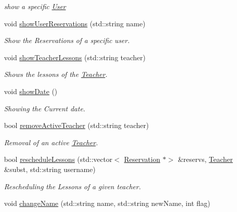 \begin{DoxyCompactItemize}
\begin{DoxyCompactList}\small\item\em show a specific \mbox{\hyperlink{class_user}{User}} \end{DoxyCompactList}\item 
void \mbox{\hyperlink{class_company_a428b70dbf9acd5edb34ee131ff1f8613}{show\+User\+Reservations}} (std\+::string name)
\begin{DoxyCompactList}\small\item\em Show the Reservations of a specific user. \end{DoxyCompactList}\item 
void \mbox{\hyperlink{class_company_aef95f2feab286505091c38db23cd1c90}{show\+Teacher\+Lessons}} (std\+::string teacher)
\begin{DoxyCompactList}\small\item\em Shows the lessons of the \mbox{\hyperlink{class_teacher}{Teacher}}. \end{DoxyCompactList}\item 
\mbox{\label{class_company_ad5477594a7c735a070c9076192d0bfe1}} 
void \mbox{\hyperlink{class_company_ad5477594a7c735a070c9076192d0bfe1}{show\+Date}} ()
\begin{DoxyCompactList}\small\item\em Showing the Current date. \end{DoxyCompactList}\item 
bool \mbox{\hyperlink{class_company_ad35562fb6b18125ab7fe30cb79639cf7}{remove\+Active\+Teacher}} (std\+::string teacher)
\begin{DoxyCompactList}\small\item\em Removal of an active \mbox{\hyperlink{class_teacher}{Teacher}}. \end{DoxyCompactList}\item 
bool \mbox{\hyperlink{class_company_ae858645003e1a2cd2e38f6db4feda488}{reschedule\+Lessons}} (std\+::vector$<$ \mbox{\hyperlink{class_reservation}{Reservation}} $\ast$$>$ \&reservs, \mbox{\hyperlink{class_teacher}{Teacher}} \&subst, std\+::string username)
\begin{DoxyCompactList}\small\item\em Rescheduling the Lessons of a given teacher. \end{DoxyCompactList}\item 
void \mbox{\hyperlink{class_company_a51a026758b4b56b4a2e0fa937125480d}{change\+Name}} (std\+::string name, std\+::string new\+Name, int flag)
$$
\end{DoxyCompactItemize}
